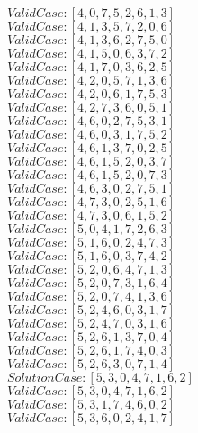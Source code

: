 \documentclass{article}
\begin{document}
	$Valid Case   : [4, 0, 7, 5, 2, 6, 1, 3]$\\
	$Valid Case   : [4, 1, 3, 5, 7, 2, 0, 6]$\\
	$Valid Case   : [4, 1, 3, 6, 2, 7, 5, 0]$\\
	$Valid Case   : [4, 1, 5, 0, 6, 3, 7, 2]$\\
	$Valid Case   : [4, 1, 7, 0, 3, 6, 2, 5]$\\
	$Valid Case   : [4, 2, 0, 5, 7, 1, 3, 6]$\\
	$Valid Case   : [4, 2, 0, 6, 1, 7, 5, 3]$\\
	$Valid Case   : [4, 2, 7, 3, 6, 0, 5, 1]$\\
	$Valid Case   : [4, 6, 0, 2, 7, 5, 3, 1]$\\
	$Valid Case   : [4, 6, 0, 3, 1, 7, 5, 2]$\\
	$Valid Case   : [4, 6, 1, 3, 7, 0, 2, 5]$\\
	$Valid Case   : [4, 6, 1, 5, 2, 0, 3, 7]$\\
	$Valid Case   : [4, 6, 1, 5, 2, 0, 7, 3]$\\
	$Valid Case   : [4, 6, 3, 0, 2, 7, 5, 1]$\\
	$Valid Case   : [4, 7, 3, 0, 2, 5, 1, 6]$\\
	$Valid Case   : [4, 7, 3, 0, 6, 1, 5, 2]$\\
	$Valid Case   : [5, 0, 4, 1, 7, 2, 6, 3]$\\
	$Valid Case   : [5, 1, 6, 0, 2, 4, 7, 3]$\\
	$Valid Case   : [5, 1, 6, 0, 3, 7, 4, 2]$\\
	$Valid Case   : [5, 2, 0, 6, 4, 7, 1, 3]$\\
	$Valid Case   : [5, 2, 0, 7, 3, 1, 6, 4]$\\
	$Valid Case   : [5, 2, 0, 7, 4, 1, 3, 6]$\\
	$Valid Case   : [5, 2, 4, 6, 0, 3, 1, 7]$\\
	$Valid Case   : [5, 2, 4, 7, 0, 3, 1, 6]$\\
	$Valid Case   : [5, 2, 6, 1, 3, 7, 0, 4]$\\
	$Valid Case   : [5, 2, 6, 1, 7, 4, 0, 3]$\\
	$Valid Case   : [5, 2, 6, 3, 0, 7, 1, 4]$\\
	$Solution Case: [5, 3, 0, 4, 7, 1, 6, 2]$\\
	$Valid Case   : [5, 3, 0, 4, 7, 1, 6, 2]$\\
	$Valid Case   : [5, 3, 1, 7, 4, 6, 0, 2]$\\
	$Valid Case   : [5, 3, 6, 0, 2, 4, 1, 7]$\\
\end{document}
